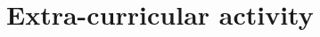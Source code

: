 \documentclass[11pt,a4paper,sans]{moderncv}        %
\begin{document}








\section{Extra-curricular activity}

\vspace{6pt}
\end{document}
